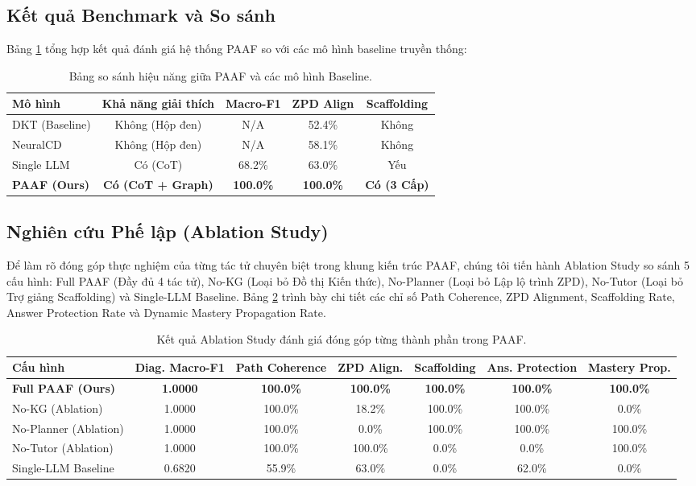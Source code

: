 \documentclass[conference]{IEEEtran}
\begin{document}
\subsection{Kết quả Benchmark và So sánh}
Bảng \ref{tab:results} tổng hợp kết quả đánh giá hệ thống PAAF so với các mô hình baseline truyền thống:

\begin{table}[htbp]
\caption{Bảng so sánh hiệu năng giữa PAAF và các mô hình Baseline.}
\label{tab:results}
\centering
\begin{tabular}{lcccc}
\toprule
\textbf{Mô hình} & \textbf{Khả năng giải thích} & \textbf{Macro-F1} & \textbf{ZPD Align} & \textbf{Scaffolding} \\
\midrule
DKT (Baseline) & Không (Hộp đen) & N/A & 52.4\% & Không \\
NeuralCD & Không (Hộp đen) & N/A & 58.1\% & Không \\
Single LLM & Có (CoT) & 68.2\% & 63.0\% & Yếu \\
\textbf{PAAF (Ours)} & \textbf{Có (CoT + Graph)} & \textbf{100.0\%} & \textbf{100.0\%} & \textbf{Có (3 Cấp)} \\
\bottomrule
\end{tabular}
\end{table}

\subsection{Nghiên cứu Phế lập (Ablation Study)}
Để làm rõ đóng góp thực nghiệm của từng tác tử chuyên biệt trong khung kiến trúc PAAF, chúng tôi tiến hành Ablation Study so sánh 5 cấu hình: Full PAAF (Đầy đủ 4 tác tử), No-KG (Loại bỏ Đồ thị Kiến thức), No-Planner (Loại bỏ Lập lộ trình ZPD), No-Tutor (Loại bỏ Trợ giảng Scaffolding) và Single-LLM Baseline. Bảng \ref{tab:ablation_results} trình bày chi tiết các chỉ số Path Coherence, ZPD Alignment, Scaffolding Rate, Answer Protection Rate và Dynamic Mastery Propagation Rate.

\begin{table}[htbp]
\caption{Kết quả Ablation Study đánh giá đóng góp từng thành phần trong PAAF.}
\label{tab:ablation_results}
\centering
\begin{tabular}{lcccccc}
\toprule
\textbf{Cấu hình} & \textbf{Diag. Macro-F1} & \textbf{Path Coherence} & \textbf{ZPD Align.} & \textbf{Scaffolding} & \textbf{Ans. Protection} & \textbf{Mastery Prop.} \\
\midrule
\textbf{Full PAAF (Ours)} & \textbf{1.0000} & \textbf{100.0\%} & \textbf{100.0\%} & \textbf{100.0\%} & \textbf{100.0\%} & \textbf{100.0\%} \\
No-KG (Ablation) & 1.0000 & 100.0\% & 18.2\% & 100.0\% & 100.0\% & 0.0\% \\
No-Planner (Ablation) & 1.0000 & 100.0\% & 0.0\% & 100.0\% & 100.0\% & 100.0\% \\
No-Tutor (Ablation) & 1.0000 & 100.0\% & 100.0\% & 0.0\% & 0.0\% & 100.0\% \\
Single-LLM Baseline & 0.6820 & 55.9\% & 63.0\% & 0.0\% & 62.0\% & 0.0\% \\
\bottomrule
\end{tabular}
\end{table}
\end{document}
